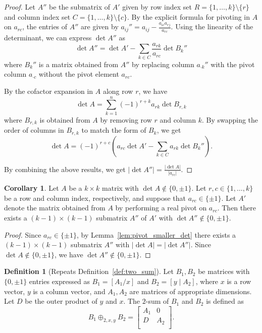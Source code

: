 \documentclass{article}
\theoremstyle{definition}
\newtheorem{definition}{Definition}
\newtheorem{corollary}{Corollary}
\begin{document}
\begin{proof}
    Let $A''$ be the submatrix of $A'$ given by row index set $R = \{1, \dots, k\} \setminus \{r\}$ and column index set $C = \{1, \dots, k\} \setminus \{c\}$. By the explicit formula for pivoting in $A$ on $a_{rc}$, the entries of $A''$ are given by $a_{ij}'' = a_{ij} - \frac{a_{ic} a_{rj}}{a_{rc}}$. Using the linearity of the determinant, we can express $\det A''$ as
    \[
        \det A'' = \det A' - \sum_{k \in C} \frac{a_{rk}}{a_{rc}} \det B_{k}''
    \]
    where $B_{k}''$ is a matrix obtained from $A''$ by replacing column $a_{\cdot k}''$ with the pivot column $a_{\cdot c}$ without the pivot element $a_{rc}$.

    By the cofactor expansion in $A$ along row $r$, we have
    \[
        \det A = \sum_{k = 1}^{n} (-1)^{r + k} a_{rk} \det B_{r, k}
    \]
    where $B_{r, k}$ is obtained from $A$ by removing row $r$ and column $k$. By swapping the order of columns in $B_{r, k}$ to match the form of $B_{k}$, we get
    \[
        \det A = (-1)^{r + c} (a_{rc} \det A' - \sum_{k \in C} a_{rk} \det B_{k}'').
    \]

    By combining the above results, we get $|\det A''| = \frac{|\det A|}{|a_{rc}|}$.
\end{proof}

\begin{corollary}\label{cor:pivot_smaller_det}
    Let $A$ be a $k \times k$ matrix with $\det A \notin \{0, \pm 1\}$. Let $r, c \in \{1, \dots, k\}$ be a row and column index, respectively, and suppose that $a_{rc} \in \{\pm 1\}$. Let $A'$ denote the matrix obtained from $A$ by performing a real pivot on $a_{rc}$. Then there exists a $(k - 1) \times (k - 1)$ submatrix $A''$ of $A'$ with $\det A'' \notin \{0, \pm 1\}$.
\end{corollary}

\begin{proof}
    Since $a_{rc} \in \{\pm 1\}$, by Lemma~\ref{lem:pivot_smaller_det} there exists a $(k - 1) \times (k - 1)$ submatrix $A''$ with $|\det A| = |\det A''|$. Since $\det A \notin \{0, \pm 1\}$, we have $\det A'' \notin \{0, \pm 1\}$.
\end{proof}

\begin{definition}[Repeats Definition~\ref{def:two_sum}]\label{def:two_sum_again}
    Let $B_{1}, B_{2}$ be matrices with $\{0, \pm 1\}$ entries expressed as $B_{1} = \left[A_{1} / x\right]$ and $B_{2} = \left[y \mid A_{2}\right]$, where $x$ is a row vector, $y$ is a column vector, and $A_{1}, A_{2}$ are matrices of appropriate dimensions. Let $D$ be the outer product of $y$ and $x$. The $2$-sum of $B_{1}$ and $B_{2}$ is defined as
    \[
        B_{1} \oplus_{2, x, y} B_{2} = \begin{bmatrix}
            A_{1} & 0 \\
            D & A_{2} \\
        \end{bmatrix}.
    \]
\end{definition}
\end{document}
